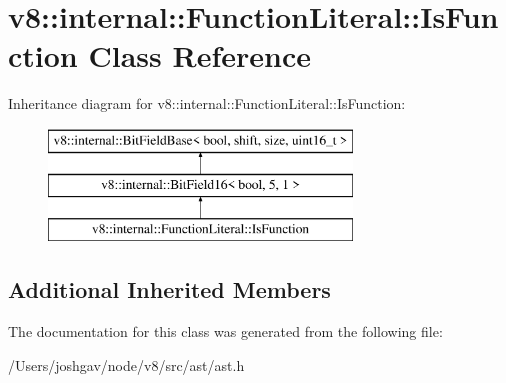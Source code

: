 \hypertarget{classv8_1_1internal_1_1_function_literal_1_1_is_function}{}\section{v8\+:\+:internal\+:\+:Function\+Literal\+:\+:Is\+Function Class Reference}
\label{classv8_1_1internal_1_1_function_literal_1_1_is_function}
Inheritance diagram for v8\+:\+:internal\+:\+:Function\+Literal\+:\+:Is\+Function\+:\begin{figure}[H]
\begin{center}
\leavevmode
\includegraphics[height=3.000000cm]{classv8_1_1internal_1_1_function_literal_1_1_is_function}
\end{center}
\end{figure}
\subsection*{Additional Inherited Members}


The documentation for this class was generated from the following file\+:\begin{DoxyCompactItemize}
\item 
/\+Users/joshgav/node/v8/src/ast/ast.\+h\end{DoxyCompactItemize}
